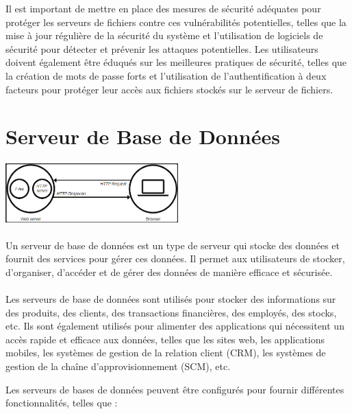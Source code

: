 Il est important de mettre en place des mesures de sécurité adéquates pour protéger les serveurs de fichiers contre ces vulnérabilités potentielles, telles que la mise à jour régulière de la sécurité du système et l'utilisation de logiciels de sécurité pour détecter et prévenir les attaques potentielles. Les utilisateurs doivent également être éduqués sur les meilleures pratiques de sécurité, telles que la création de mots de passe forts et l'utilisation de l'authentification à deux facteurs pour protéger leur accès aux fichiers stockés sur le serveur de fichiers.
\section{Serveur de Base de Données }
\vspace{4mm}
\paragraph{
	\includegraphics[width=0.5\textwidth]{Server_web.png}}
\paragraph{ }
Un serveur de base de données est un type de serveur qui stocke des données et fournit des services pour gérer ces données. Il permet aux utilisateurs de stocker, d'organiser, d'accéder et de gérer des données de manière efficace et sécurisée.
\paragraph{ }
Les serveurs de base de données sont utilisés pour stocker des informations sur des produits, des clients, des transactions financières, des employés, des stocks, etc. Ils sont également utilisés pour alimenter des applications qui nécessitent un accès rapide et efficace aux données, telles que les sites web, les applications mobiles, les systèmes de gestion de la relation client (CRM), les systèmes de gestion de la chaîne d'approvisionnement (SCM), etc.

Les serveurs de bases de données peuvent être configurés pour fournir différentes fonctionnalités, telles que :

